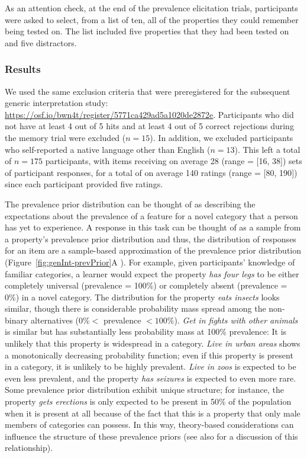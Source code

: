 \documentclass[floatsintext,doc]{apa6}
\begin{document}
As an attention check, at the end of the prevalence elicitation trials, participants were asked to select, from a list of ten, all of the properties they could remember being tested on.
The list included five properties that they had been tested on and five distractors.

\hypertarget{results}{%
\subsubsection{Results}\label{results}}
We used the same exclusion criteria that were preregistered for the subsequent generic interpretation study: \url{https://osf.io/bwn4t/register/5771ca429ad5a1020de2872e}.
Participants who did not have at least 4 out of 5 hits and at least 4 out of 5 correct rejections during the memory trial were excluded (\(n = 15\)).
In addition, we excluded participants who self-reported a native language other than English (\(n = 13\)).
This left a total of \(n = 175\) participants, with items receiving on average 28 (range = {[}16, 38{]}) sets of participant responses, for a total of on average 140 ratings (range = {[}80, 190{]}) since each participant provided five ratings.

The prevalence prior distribution can be thought of as describing the expectations about the prevalence of a feature for a novel category that a person has yet to experience. 
A response in this task can be thought of as a sample from a property's prevalence prior distribution and thus, the distribution of responses for an item are a sample-based approximation of the prevalence prior distribution (Figure~\ref{fig:genInt-prevPrior}A ). 
For example, given participants' knowledge of familiar categories, a learner would expect the property \emph{has four legs} to be either completely universal (prevalence = 100\%) or completely absent (prevalence = 0\%) in a novel category.
The distribution for the property \emph{eats insects} looks similar, though there is considerable probability mass spread among the non-binary alternatives (\(0\% <\) prevalence \(< 100\%\)).
\emph{Get in fights with other animals} is similar but has substantially less probability mass at 100\% prevalence: It is unlikely that this property is widespread in a category.
\emph{Live in urban areas} shows a monotonically decreasing probability function; even if this property is present in a category, it is unlikely to be highly prevalent. 
\emph{Live in zoos} is expected to be even less prevalent, and the property \emph{has seizures} is expected to even more rare.
Some prevalence prior distribution exhibit unique structure; for instance,  the property \emph{gets erections} is only expected to be present in 50\% of the population when it is present at all because of the fact that this is a property that only male members of categories can possess. In this way, theory-based considerations can influence the structure of these prevalence priors (see also  for a discussion of this relationship). 
\end{document}
